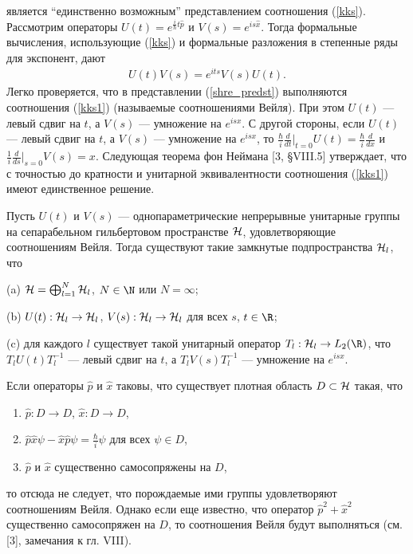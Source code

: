 \documentclass[a4paper
]{article}
\begin{document}
является ``единственно возможным'' представлением соотношения (\ref{kks}).
Рассмотрим операторы $U(t)=e^{\frac{i}{\hbar}t\hat{p}}$ и $V(s)=e^{is\hat{x}}$.
Тогда формальные вычисления, использующие (\ref{kks})
и формальные разложения в степенные ряды для экспонент, дают
\begin{align}
\label{kks1}
U(t)V(s)=e^{its}V(s)U(t).
\end{align}
Легко проверяется, что в представлении (\ref{shre_predst}) выполняются
соотношения (\ref{kks1}) (называемые соотношениями Вейля). При этом
$U(t)$ --- левый сдвиг на $t$, а $V(s)$ --- умножение на $e^{isx}$.
С другой стороны, если $U(t)$ --- левый сдвиг на $t$, а $V(s)$ ---
умножение на $e^{isx}$, то $\frac{\hbar}{i}\frac{d}{dt}|_{t=0}U(t)
=\frac{\hbar}{i}\frac{d}{dx}$ и $\frac{1}{i}\frac{d}{ds}|_{s=0}V(s)
=x$. Следующая теорема фон Неймана [3, \S VIII.5] утверждает,
что с точностью до кратности и унитарной эквивалентности соотношения
(\ref{kks1}) имеют единственное решение.
\begin{Trm}
Пусть $U(t)$ и $V(s)$ --- однопараметрические непрерывные унитарные
группы на сепарабельном гильбертовом пространстве ${\cal H}$,
удовлетворяющие соотношениям Вейля. Тогда существуют такие замкнутые
подпространства ${\cal H}_l$, что \par
(a) ${\cal H}=\bigoplus_{l=1}^N {\cal H}_l$, $N\in \N$ или $N=\infty$; \par
(b) $U(t):{\cal H}_l\rightarrow {\cal H}_l$, $V(s):{\cal H}_l\rightarrow
{\cal H}_l$ для всех $s$, $t\in \R$; \par
(c) для каждого $l$ существует такой унитарный оператор $T_l:{\cal H}_l
\rightarrow L_2(\R)$, что $T_lU(t)T_l^{-1}$ --- левый сдвиг на $t$,
а $T_lV(s)T_l^{-1}$ --- умножение на $e^{isx}$.
\end{Trm}
Если операторы $\hat{p}$ и $\hat{x}$ таковы, что существует плотная область
$D\subset {\cal H}$ такая, что
\begin{enumerate}
\item $\hat{p}:D\rightarrow D$, $\hat{x}:D\rightarrow D$,
\item $\hat{p}\hat{x}\psi-\hat{x}\hat{p}\psi=\frac{\hbar}{i}\psi$ для
всех $\psi\in D$,
\item $\hat{p}$ и $\hat{x}$ существенно самосопряжены на $D$,
\end{enumerate}
то отсюда не следует, что порождаемые ими группы удовлетворяют
соотношениям Вейля. Однако если еще известно, что оператор $\hat{p}^2
+\hat{x}^2$ существенно самосопряжен на $D$, то соотношения Вейля
будут выполняться (см. [3], замечания к гл. VIII). \par
\end{document}

